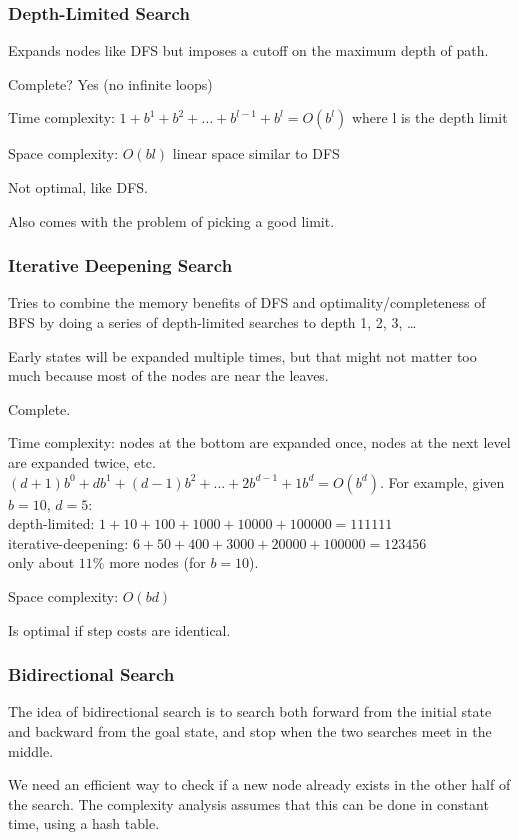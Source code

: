 \subsubsection{Depth-Limited Search}
Expands nodes like DFS but imposes a cutoff on the maximum depth of path.

Complete? Yes (no infinite loops)

Time complexity: $1 + b^1 + b^2 + \ldots + b^{l-1} + b^l = O(b^l)$ where l is the depth limit

Space complexity: $O(bl)$ linear space similar to DFS

Not optimal, like DFS.

Also comes with the problem of picking a good limit.

\subsubsection{Iterative Deepening Search}
Tries to combine the memory benefits of DFS and optimality/completeness of BFS
by doing a series of depth-limited searches to depth 1, 2, 3, \ldots

Early states will be expanded multiple times, but that might not matter too
much because most of the nodes are near the leaves.

Complete.

Time complexity: nodes at the bottom are expanded once, nodes at the next level
are expanded twice, etc. $(d+1)b^0 + db^1 + (d-1)b^2 + ... + 2b^{d-1} + 1b^d =
O(b^d)$. For example, given $b = 10$, $d = 5$:\\
\indent depth-limited: $1 + 10 + 100 + 1000 + 10000 + 100000 = 111111$\\
\indent iterative-deepening: $6 + 50 + 400 + 3000 + 20000 + 100000 = 123456$\\
only about $11\%$ more nodes (for $b = 10$).

Space complexity: $O(bd)$

Is optimal if step costs are identical.

\subsubsection{Bidirectional Search}
The idea of bidirectional search is to search both forward from the initial
state and backward from the goal state, and stop when the two searches meet in
the middle.

We need an efficient way to check if a new node already exists in the other
half of the search. The complexity analysis assumes that this can be done in
constant time, using a hash table.

